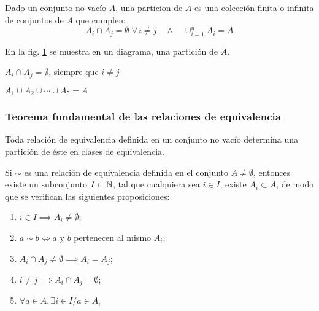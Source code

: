 \begin{fmd-definition}[Partición] 
	Dado un conjunto no vacío $A$, una \gls{particion} de $A$ es una colección finita o infinita de conjuntos de $A$ que cumplen:
	\[ A_i \cap A_j = \emptyset \; \forall \, i \ne j \quad \land \quad \cup_{i=1}^n A_i = A \]
\end{fmd-definition}

En la fig. \ref{fig:particion} se muestra en un diagrama, una partición de $A$.

\begin{minipage}{.45\textwidth}
	\begin{figure}[H]
		\centering
		
		\caption{}
		\label{fig:particion}
	\end{figure}
\end{minipage}
\begin{minipage}{.45\textwidth}
	$A_i \cap A_j = \emptyset$, siempre que $i \ne j$
	
	$A_1 \cup A_2 \cup \cdots \cup A_5 = A$
\end{minipage}

\subsubsection{Teorema fundamental de las relaciones de equivalencia}
Toda relación de equivalencia definida en un conjunto no vacío determina una partición de éste en clases de equivalencia.

\begin{fmd-theorem}
	Si $\sim$ es una relación de equivalencia definida en el conjunto $A \ne \emptyset$, entonces existe un subconjunto $I \subset \mathbb{N}$, tal que cualquiera sea $i \in I$, existe $A_i \subset A$, de modo que se verifican las siguientes proposiciones:
	\begin{enumerate}[label=\roman*)]
		\item $i \in I \implies A_i \ne \emptyset$;
		\item $a \sim b \iff a$ y $b$ pertenecen al mismo $A_i$;
		\item $A_i \cap A_j \ne \emptyset \implies A_i = A_j$;
		\item $i \ne j \implies A_i \cap A_j = \emptyset$;
		\item $\forall a \in A, \exists i \in I / a \in A_i$
	\end{enumerate}
\end{fmd-theorem}

